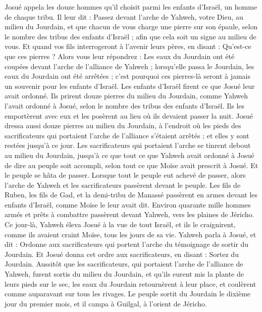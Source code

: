 \begin{multicols}{2}
Josué appela les douze hommes qu’il choisit parmi les enfants d’Israël, un homme de chaque tribu.
Il leur dit : Passez devant l’arche de Yahweh, votre Dieu, au milieu du Jourdain, et que chacun de vous charge une pierre sur son épaule, selon le nombre des tribus des enfants d’Israël ;
afin que cela soit un signe au milieu de vous. Et quand vos fils interrogeront à l’avenir leurs pères, en disant : Qu’est-ce que ces pierres ?
Alors vous leur répondrez : Les eaux du Jourdain ont été coupées devant l’arche de l’alliance de Yahweh ; lorsqu’elle passa le Jourdain, les eaux du Jourdain ont été arrêtées ; c’est pourquoi ces pierres-là seront à jamais un souvenir pour les enfants d’Israël.
Les enfants d’Israël firent ce que Josué leur avait ordonné. Ils prirent douze pierres du milieu du Jourdain, comme Yahweh l’avait ordonné à Josué, selon le nombre des tribus des enfants d’Israël. Ils les emportèrent avec eux et les posèrent au lieu où ils devaient passer la nuit.
Josué dressa aussi douze pierres au milieu du Jourdain, à l’endroit où les pieds des sacrificateurs qui portaient l’arche de l’alliance s’étaient arrêtés ; et elles y sont restées jusqu’à ce jour.
Les sacrificateurs qui portaient l’arche se tinrent debout au milieu du Jourdain, jusqu’à ce que tout ce que Yahweh avait ordonné à Josué de dire au peuple soit accompli, selon tout ce que Moïse avait prescrit à Josué. Et le peuple se hâta de passer.
Lorsque tout le peuple eut achevé de passer, alors l’arche de Yahweh et les sacrificateurs passèrent devant le peuple.
Les fils de Ruben, les fils de Gad, et la demi-tribu de Manassé passèrent en armes devant les enfants d’Israël, comme Moïse le leur avait dit.
Environ quarante mille hommes armés et prêts à combattre passèrent devant Yahweh, vers les plaines de Jéricho.
Ce jour-là, Yahweh éleva Josué à la vue de tout Israël, et ils le craignirent, comme ils avaient craint Moïse, tous les jours de sa vie.
Yahweh parla à Josué, et dit :
Ordonne aux sacrificateurs qui portent l’arche du témoignage de sortir du Jourdain.
Et Josué donna cet ordre aux sacrificateurs, en disant : Sortez du Jourdain.
Aussitôt que les sacrificateurs, qui portaient l’arche de l’alliance de Yahweh, furent sortis du milieu du Jourdain, et qu’ils eurent mis la plante de leurs pieds sur le sec, les eaux du Jourdain retournèrent à leur place, et coulèrent comme auparavant sur tous les rivages.
Le peuple sortit du Jourdain le dixième jour du premier mois, et il campa à Guilgal, à l’orient de Jéricho.

\end{multicols}
